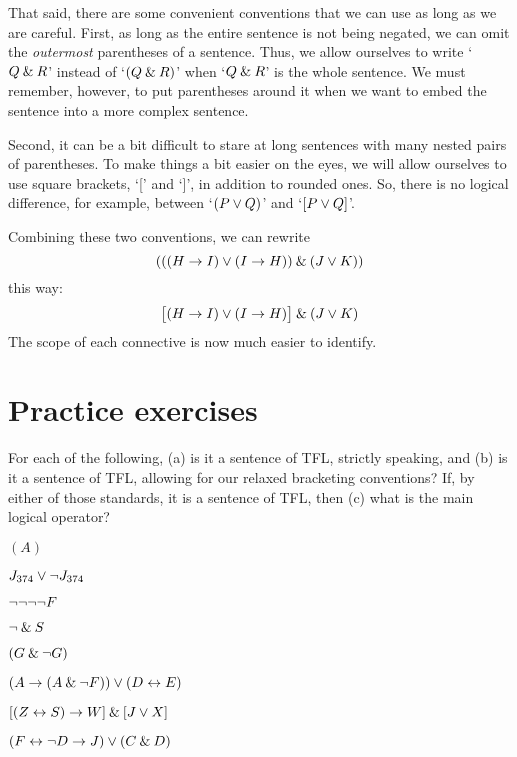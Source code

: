 That said, there are some convenient conventions that we can use as long as we are careful. First, as long as the entire sentence is not being negated,  we can omit the \emph{outermost} parentheses of a sentence. Thus, we allow ourselves to write `$Q \mathbin{\&} R$' instead of `$(Q \mathbin{\&} R)$' when `$Q \mathbin{\&} R$' is the whole sentence. We must remember, however, to put parentheses around it when we want to embed the sentence into a more complex sentence.

Second, it can be a bit difficult to stare at long sentences with many nested pairs of parentheses. To make things a bit easier on the eyes, we will allow ourselves to use square brackets, `[' and `]', in addition to rounded ones. So, there is no logical difference, for example, between `$(P\vee Q)$' and `$[P\vee Q]$'. 

Combining these two conventions, we can rewrite 
$$(((H \rightarrow I) \vee (I \rightarrow H)) \mathbin{\&} (J \vee K))$$
this way:
$$\bigl[(H \rightarrow I) \vee (I \rightarrow H)\bigr] \mathbin{\&} (J \vee K)$$
The scope of each connective is now much easier to identify.




\filbreak

\section{Practice exercises}
\setcounter{ProbPart}{0}

\problempart
\label{pr.wiffTFL}
For each of the following, (a) is it a sentence of TFL, strictly speaking, and (b) is it a sentence of TFL, allowing for our relaxed bracketing conventions? If, by either of those standards, it is a sentence of TFL, then (c) what is the main logical operator?
\begin{earg}
\item $(A)$
\item $J_{374} \vee {\neg} J_{374}$
\item ${\neg} {\neg} {\neg} {\neg} F$
\item ${\neg} \mathbin{\&} S$
\item $(G \mathbin{\&} {\neg} G)$
\item $(A \rightarrow (A \mathbin{\&} {\neg} F)) \vee (D \leftrightarrow E)$
\item $[(Z \leftrightarrow S) \rightarrow W] \mathbin{\&} [J \vee X]$
\item $(F \leftrightarrow {\neg} D \rightarrow J) \vee (C \mathbin{\&} D)$
\end{earg}

